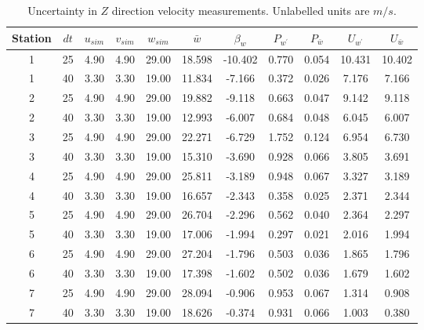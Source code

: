 \begin{table}[H]
\begin{center}
\begin{tabular}{|ccccccccccc|}
	\hline
	Station & $dt$ & $u_{sim}$ & $v_{sim}$ & $w_{sim}$ & $\bar{w}$ & $\beta_w$ & $P_{w^{\prime}}$ & $P_{\bar{w}}$ & $U_{w^{\prime}}$ & $U_{\bar{w}}$\\
	\hline
	1 & 25 & 4.90 & 4.90 & 29.00 & 18.598 & -10.402 & 0.770 & 0.054 & 10.431 & 10.402\\
	1 & 40 & 3.30 & 3.30 & 19.00 & 11.834 & -7.166 & 0.372 & 0.026 & 7.176 & 7.166\\
	2 & 25 & 4.90 & 4.90 & 29.00 & 19.882 & -9.118 & 0.663 & 0.047 & 9.142 & 9.118\\
	2 & 40 & 3.30 & 3.30 & 19.00 & 12.993 & -6.007 & 0.684 & 0.048 & 6.045 & 6.007\\
	3 & 25 & 4.90 & 4.90 & 29.00 & 22.271 & -6.729 & 1.752 & 0.124 & 6.954 & 6.730\\
	3 & 40 & 3.30 & 3.30 & 19.00 & 15.310 & -3.690 & 0.928 & 0.066 & 3.805 & 3.691\\
	4 & 25 & 4.90 & 4.90 & 29.00 & 25.811 & -3.189 & 0.948 & 0.067 & 3.327 & 3.189\\
	4 & 40 & 3.30 & 3.30 & 19.00 & 16.657 & -2.343 & 0.358 & 0.025 & 2.371 & 2.344\\
	5 & 25 & 4.90 & 4.90 & 29.00 & 26.704 & -2.296 & 0.562 & 0.040 & 2.364 & 2.297\\
	5 & 40 & 3.30 & 3.30 & 19.00 & 17.006 & -1.994 & 0.297 & 0.021 & 2.016 & 1.994\\
	6 & 25 & 4.90 & 4.90 & 29.00 & 27.204 & -1.796 & 0.503 & 0.036 & 1.865 & 1.796\\
	6 & 40 & 3.30 & 3.30 & 19.00 & 17.398 & -1.602 & 0.502 & 0.036 & 1.679 & 1.602\\
	7 & 25 & 4.90 & 4.90 & 29.00 & 28.094 & -0.906 & 0.953 & 0.067 & 1.314 & 0.908\\
	7 & 40 & 3.30 & 3.30 & 19.00 & 18.626 & -0.374 & 0.931 & 0.066 & 1.003 & 0.380\\
	\hline
\end{tabular}
\caption{Uncertainty in $Z$ direction velocity measurements. Unlabelled units are $m/s$.}
\label{table:uncertainties_w}
\end{center}
\end{table}
